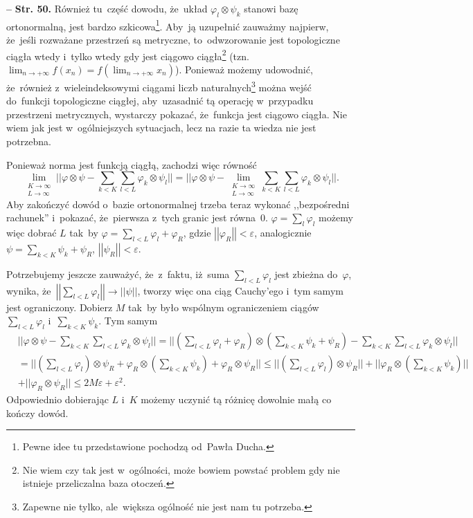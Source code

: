 \documentclass[a4paper,11pt]{article}
\newcommand{\ra}{\rightarrow}
\newcommand{\wtw}{wtedy i~tylko wtedy}
\newcommand{\veps}{\varepsilon}
\newcommand{\vp}{\varphi}
\newcommand{\ot}{\otimes}
\newcommand{\Lim}{\lim\limits}
\newcommand{\Sum}{\sum\limits}
\newcommand{\norm}[1]{\left|\left| #1 \right|\right|}
\newcommand{\tb}{\textbf}
\newcommand{\noi}{\noindent}
\newcommand{\start}{\noi \tb{--} {}}
\newcommand{\Str}[1]{\tb{Str. #1.}}
\begin{document}
\start \Str{50} Również tu~część dowodu, że~układ
$\vp_{ l } \ot \psi_{ k }$ stanowi bazę ortonormalną, jest bardzo
szkicowa\footnote{Pewne idee tu przedstawione pochodzą od~Pawła
  Ducha.}. Aby~ją uzupełnić zauważmy najpierw, że~jeśli rozważane
przestrzeń są metryczne, to~odwzorowanie jest topologiczne
ciągła %
\wtw%
gdy jest ciągowo ciągła\footnote{Nie wiem czy tak jest w~ogólności,
  może bowiem powstać problem gdy nie istnieje przeliczalna baza
  otoczeń.} (tzn.
$\lim_{ n \ra +\infty } f( x_{ n } ) = f( \lim_{ n \ra +\infty } x_{ n
} )$). Ponieważ możemy udowodnić, że~również z~wieleindeksowymi
ciągami liczb naturalnych\footnote{Zapewne nie tylko, ale~większa
  ogólność nie jest nam tu potrzeba.} można wejść do~funkcji
topologiczne ciągłej, aby~uzasadnić tą operację w~przypadku
przestrzeni metrycznych, wystarczy pokazać, że~funkcja jest ciągowo
ciągła. Nie wiem jak jest w~ogólniejszych sytuacjach, lecz na razie ta
wiedza nie jest potrzebna.

Ponieważ norma jest funkcją ciągłą, zachodzi więc równość
\begin{equation*}
  \Lim_{ \substack{ K \ra \infty \\ L \ra \infty } } || \vp \ot \psi
  - \Sum_{ k < K }\Sum_{ l < L } \vp_{ k } \ot \psi_{ l } ||
  = || \vp \ot \psi - \Lim_{ \substack{ K \ra \infty \\ L \ra \infty } } \Sum_{ k < K }
  \Sum_{ l < L } \vp_{ k } \ot \psi_{ l } ||.
\end{equation*}
Aby zakończyć dowód o~bazie ortonormalnej trzeba teraz wykonać
,,bezpośredni rachunek'' i~pokazać, że~pierwsza z~tych granic jest
równa~0. $\vp = \sum_{ l } \vp_{ l }$ możemy więc dobrać $L$ tak~by
$\vp = \sum_{ l < L } \vp_{ l } + \vp_{ R }$, gdzie
$\norm{ \vp_{ R } } < \veps$, analogicznie
$\psi = \sum_{ k < K } \psi_{ k } + \psi_{ R }$,
$\norm{ \psi_{ R } } < \veps$.

Potrzebujemy jeszcze zauważyć, że~z~faktu, iż~suma
$\sum_{ l < L } \vp_{ l }$ jest zbieżna do~$\vp$, wynika,
że~$\norm{ \sum_{ l < L } \vp_{ l } } \ra \norm{ \psi }$, tworzy więc
ona ciąg Cauchy'ego i~tym samym jest ograniczony.
Dobierz %
$M$ tak~by było wspólnym ograniczeniem ciągów
$\sum_{ l < L } \vp_{ l }$ i~$\sum_{ k < K } \psi_{ k }$. Tym samym
\begin{equation*}
  \begin{split}
    & || \vp \ot \psi - \Sum_{ k < K }\Sum_{ l < L } \vp_{ k } \ot
    \psi_{ l } || = || ( \Sum_{ l < L } \vp_{ l } + \vp_{ R } ) \ot (
    \Sum_{ k < K } \psi_{ k } + \psi_{ R } )
    - \Sum_{ k < K }\Sum_{ l < L } \vp_{ k } \ot \psi_{ l } || \\
    &= || ( \Sum_{ l < L } \vp_{ l } ) \ot \psi_{ R } + \vp_{ R } \ot
    ( \Sum_{ k < K } \psi_{ k } ) + \vp_{ R } \ot \psi_{ R } || \leq
    || ( \Sum_{ l < L } \vp_{ l } ) \ot \psi_{ R } ||
    + || \vp_{ R } \ot ( \Sum_{ k < K } \psi_{ k } ) || \\
    &+ || \vp_{ R } \ot \psi_{ R } || \leq 2 M \veps + \veps^{ 2 }.
  \end{split}
\end{equation*}
Odpowiednio dobierając $L$ i~$K$ możemy uczynić tą różnicę dowolnie
małą co kończy dowód.
\end{document}
